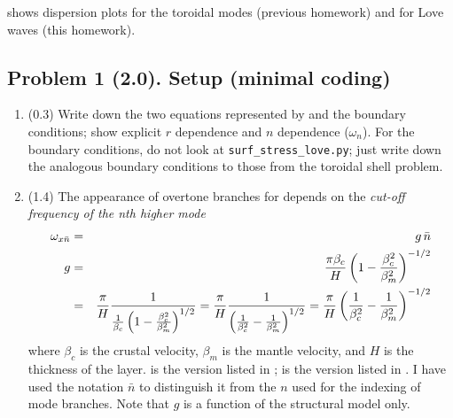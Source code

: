 \documentclass[11pt,titlepage,fleqn]{article}
\newcommand{\tfilessB}{{\tt surf\_stress\_love.py}}
\begin{document}
 shows dispersion plots for the toroidal modes (previous homework) and for Love waves (this homework).


\subsection*{Problem 1 (2.0). Setup (minimal coding)}

\begin{enumerate}

\item (0.3) Write down the two equations represented by  and the boundary conditions; show explicit $r$ dependence and $n$ dependence (\eg $\omega_n$). For the boundary conditions, do not look at \tfilessB; just write down the analogous boundary conditions to those from the toroidal shell problem.


\item (1.4) The appearance of overtone branches for  depends on the {\em cut-off frequency of the nth higher mode} 
%
\begin{eqnarray}
{\omega}_{x\bar{n}} &=& g\,\bar{n}
\label{wcn}
\\
g &=& \frac{\pi\beta_c}{H} \left( 1 - \frac{\beta_c^2}{\beta_m^2}\right)^{-1/2}
\label{wcn_Aki}
\\
&=& \frac{\pi}{H} \frac{1}{\frac{1}{\beta_c}\left(1 - \frac{\beta_c^2}{\beta_m^2} \right)^{1/2}}
= \frac{\pi}{H} \frac{1}{\left(\frac{1}{\beta_c^2} - \frac{1}{\beta_m^2} \right)^{1/2}}
= \frac{\pi}{H} \left( \frac{1}{\beta_c^2} - \frac{1}{\beta_m^2} \right)^{-1/2}
\label{wcn_SW}
\end{eqnarray}
%
where $\beta_c$ is the crustal velocity, $\beta_m$ is the mantle velocity, and $H$ is the thickness of the layer.  is the version listed in \citet[][Eq. 7.8]{AkiRichardsE2};  is the version listed in  \citet[][p. 92]{SteinWysession}. I have used the notation $\bar{n}$ to distinguish it from the $n$ used for the indexing of mode branches. Note that $g$ is a function of the structural model only.


\end{enumerate}
\end{document}

